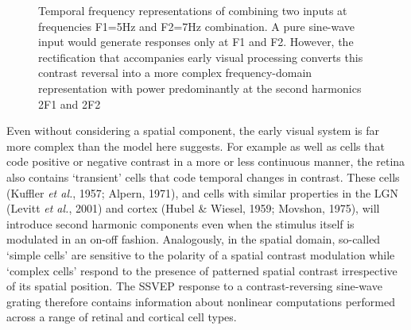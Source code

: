 \documentclass[
  letterpaper,
  DIV=11,
  numbers=noendperiod]{scrartcl}
\begin{document}
\begin{figure}


\caption{\label{fig-plotspectra}Temporal frequency representations of
combining two inputs at frequencies F1=5Hz and F2=7Hz combination. A
pure sine-wave input would generate responses only at F1 and F2.
However, the rectification that accompanies early visual processing
converts this contrast reversal into a more complex frequency-domain
representation with power predominantly at the second harmonics 2F1 and
2F2}

\end{figure}%

Even without considering a spatial component, the early visual system is
far more complex than the model here suggests. For example as well as
cells that code positive or negative contrast in a more or less
continuous manner, the retina also contains `transient' cells that code
temporal changes in contrast. These cells (Kuffler \emph{et al.}, 1957;
Alpern, 1971), and cells with similar properties in the LGN (Levitt
\emph{et al.}, 2001) and cortex (Hubel \& Wiesel, 1959; Movshon, 1975),
will introduce second harmonic components even when the stimulus itself
is modulated in an on-off fashion. Analogously, in the spatial domain,
so-called `simple cells' are sensitive to the polarity of a spatial
contrast modulation while `complex cells' respond to the presence of
patterned spatial contrast irrespective of its spatial position. The
SSVEP response to a contrast-reversing sine-wave grating therefore
contains information about nonlinear computations performed across a
range of retinal and cortical cell types.
\end{document}
